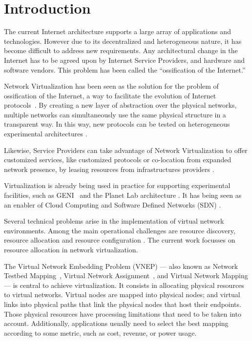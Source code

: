 \chapter{Introduction}
\label{sec:intro}


The current Internet architecture supports a large array of applications and technologies. However due to its decentralized and heterogeneous nature, it has become difficult to address new requirements. Any architectural change in the Internet has to be agreed upon by Internet Service Providers, and hardware and software vendors. This problem has been called the ``ossification of the Internet.''

Network Virtualization has been seen as the solution for the problem of ossification of the Internet, a way to facilitate the evolution of Internet protocols~\cite{Anderson2005}.
By creating a new layer of abstraction over the physical networks, multiple networks can simultaneously use the same physical structure in a transparent way.
In this way, new protocols can be tested on heterogeneous experimental architectures \cite{Anderson06geni}.

Likewise, Service Providers can take advantage of Network Virtualization to offer customized services, like customized protocols or co-location from expanded network presence, by leasing resources from infrastructures providers \cite{Feamster:2007}.

Virtualization is already being used in practice for supporting experimental facilities, such as GENI~\cite{Anderson06geni} and the Planet Lab architecture \cite{Chun:2003}. It has being seen as an enabler of Cloud Computing and Software Defined Networks (SDN) \cite{Guerzoni:2014}.

Several technical problems arise in the implementation of virtual network environments. Among the main operational challenges are resource discovery, resource allocation and resource configuration \cite{Chowdhury2010}. The current work focusses on resource allocation in network virtualization.

The Virtual Network Embedding Problem (VNEP)
--- also known as Network Testbed Mapping~\cite{Ricci:2003}, Virtual Network Assignment~\cite{Zhu:2006}, and Virtual Network Mapping \cite{Belbekkouche:2012} ---
is central to achieve virtualization.
It consists in allocating physical resources to virtual networks.
Virtual nodes are mapped into physical nodes; and virtual links into physical paths that link the physical nodes that host their endpoints.
Those physical resources have processing limitations that need to be taken into account. Additionally, applications usually need to select the best mapping according to some metric, such as cost, revenue, or power usage.

